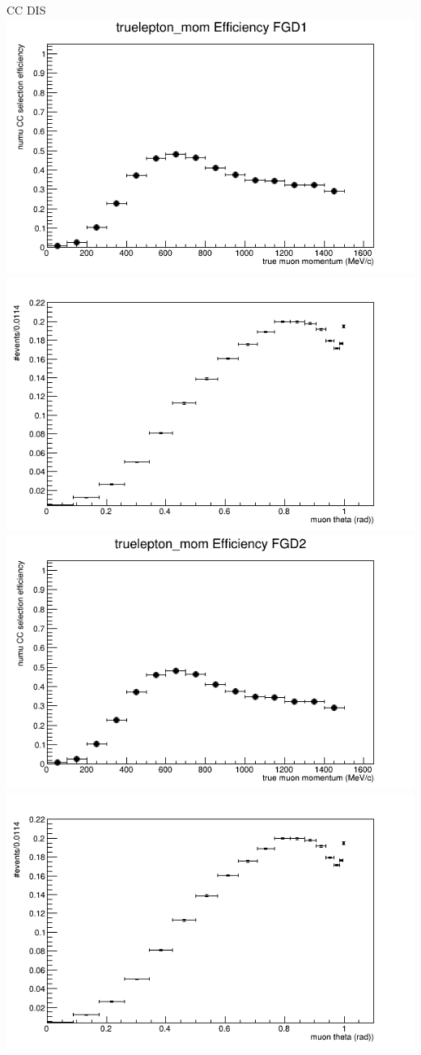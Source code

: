 \documentclass{beamer}
\begin{document}
\begin{frame}{CC DIS}
\center
\includegraphics[width=.45\textwidth]{images/Eff_truelepton_mom_topology_CC DIS_accum_level[][0][64]_data_mc.png}
\includegraphics[width=.45\textwidth]{images/Eff_truelepton_costheta_topology_CC DIS_accum_level[][0][64]_data_mc.png}
\includegraphics[width=.45\textwidth]{images/Eff_truelepton_mom_fgd2topology_CC DIS_accum_level[][1][64]_data_mc.png}
\includegraphics[width=.45\textwidth]{images/Eff_truelepton_costheta_fgd2topology_CC DIS_accum_level[][1][64]_data_mc.png}
\end{frame}
\end{document}
